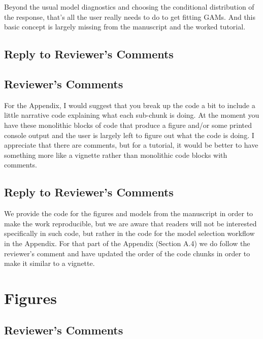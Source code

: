 \documentclass[
]{article}
\begin{document}
Beyond the usual model diagnostics and choosing the conditional distribution of the response, that's all the user really needs to do to get fitting GAMs. And this basic concept is largely missing from the manuscript and the worked tutorial.

\hypertarget{section-13}{%
\subsection{\texorpdfstring{\textcolor{reviewersblue} {Reply to Reviewer's Comments}}{}}\label{section-13}}

\hypertarget{reviewers-comments-13}{%
\subsection{Reviewer's Comments}\label{reviewers-comments-13}}

For the Appendix, I would suggest that you break up the code a bit to include a little narrative code explaining what each sub-chunk is doing. At the moment you have these monolithic blocks of code that produce a figure and/or some
printed console output and the user is largely left to figure out what the code is doing. I appreciate that there are comments, but for a tutorial, it would be better to have something more like a vignette rather than monolithic code
blocks with comments.

\hypertarget{section-14}{%
\subsection{\texorpdfstring{\textcolor{reviewersblue} {Reply to Reviewer's Comments}}{}}\label{section-14}}

We provide the code for the figures and models from the manuscript in order to make the work reproducible, but we are aware that readers will not be interested specifically in such code, but rather in the code for the model selection workflow in the Appendix. For that part of the Appendix (Section A.4) we do follow the reviewer's comment and have updated the order of the code chunks in order to make it similar to a vignette.

\hypertarget{figures}{%
\section{Figures}\label{figures}}

\hypertarget{reviewers-comments-14}{%
\subsection{Reviewer's Comments}\label{reviewers-comments-14}}
\end{document}
